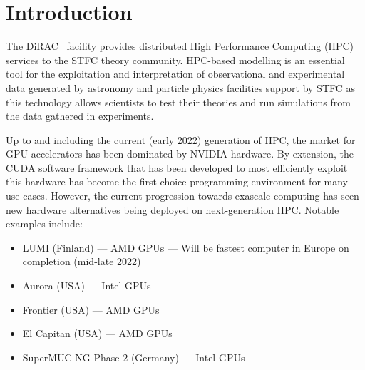 \documentclass[main]{subfiles}
\begin{document}
\section{Introduction}\label{sec:intro}

The DiRAC~\cite{dirac_distributed_nodate} facility provides distributed High Performance Computing (HPC) services to the STFC theory community.
HPC-based modelling is an essential tool for the exploitation and interpretation of observational and experimental data generated by astronomy and particle physics facilities support by STFC as this technology allows scientists to test their theories and run simulations from the data gathered in experiments.

Up to and including the current (early 2022) generation of HPC, the market for GPU accelerators has been dominated by NVIDIA hardware.
By extension, the CUDA software framework that has been developed to most efficiently exploit this hardware has become the first-choice programming environment for many use cases.
However, the current progression towards exascale computing has seen new hardware alternatives being deployed on next-generation HPC.
Notable examples include:

\begin{itemize}
	\item LUMI (Finland) --- AMD GPUs --- Will be fastest computer in Europe on completion (mid-late 2022)
	\item Aurora (USA) --- Intel GPUs
	\item Frontier (USA) --- AMD GPUs
	\item El Capitan (USA) --- AMD GPUs
	\item SuperMUC-NG Phase 2 (Germany) --- Intel GPUs
\end{itemize}
\end{document}
